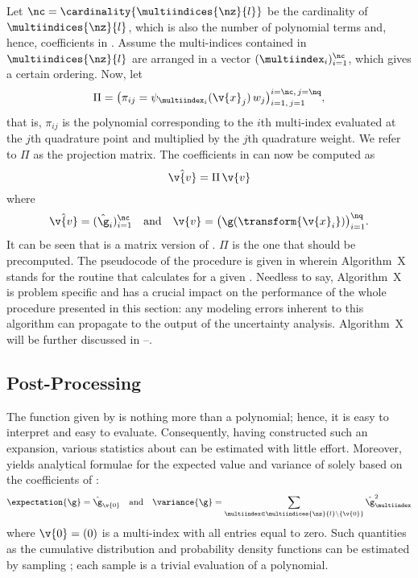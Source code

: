 Let $\nc = \cardinality{\multiindices{\nz}{l}}$ be the cardinality of
$\multiindices{\nz}{l}$, which is also the number of polynomial terms and,
hence, coefficients in . Assume the multi-indices
contained in $\multiindices{\nz}{l}$ are arranged in a vector
$(\multiindex_i)_{i = 1}^\nc$, which gives a certain ordering. Now, let
\[
  \Pi = \big( \pi_{ij} = \psi_{\multiindex_i}(\v{x}_j) \, w_j \big)_{i = 1, \, j = 1}^{i = \nc, \, j = \nq},
\]
that is, $\pi_{ij}$ is the polynomial corresponding to the $i$th multi-index
evaluated at the $j$th quadrature point and multiplied by the $j$th quadrature
weight. We refer to $\Pi$ as the projection matrix. The coefficients in
 can now be computed as
\[
  \hat{\v{v}} = \Pi \, \v{v}
\]
where
\[
  \hat{\v{v}} = (\hat{\g}_i)_{i = 1}^\nc \hspace{1em} \text{and} \hspace{1em}
  \v{v} = \big(\g(\transform{\v{x}_i}) \big)_{i = 1}^\nq.
\]
It can be seen that  is a matrix version of
. $\Pi$ is the one that should be precomputed. The
pseudocode of the procedure is given in  wherein
Algorithm~X stands for the routine that calculates \g for a given \vu. Needless
to say, Algorithm~X is problem specific and has a crucial impact on the
performance of the whole procedure presented in this section: any modeling
errors inherent to this algorithm can propagate to the output of the uncertainty
analysis. Algorithm~X will be further discussed in
--.

\subsection{Post-Processing}

The function given by  is nothing more than a
polynomial; hence, it is easy to interpret and easy to evaluate. Consequently,
having constructed such an expansion, various statistics about \g can be
estimated with little effort. Moreover,  yields
analytical formulae for the expected value and variance of \g solely based on
the coefficients of :
\[
  \expectation{\g} = \hat{\g}_{\v{0}} \hspace{1em} \text{and} \hspace{1em}
  \variance{\g} = \sum_{\multiindex \in \multiindices{\nz}{l} \setminus \{ \v{0} \}} \hat{\g}_{\multiindex}^2
\]
where $\v{0} = (0)$ is a multi-index with all entries equal to zero. Such
quantities as the cumulative distribution and probability density functions can
be estimated by sampling ; each sample is a trivial
evaluation of a polynomial.

